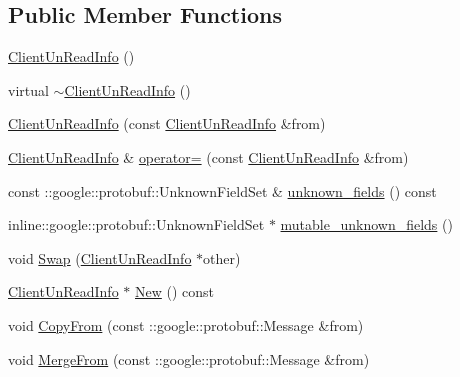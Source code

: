 \subsection*{Public Member Functions}
\begin{DoxyCompactItemize}
\item 
\hyperlink{class_i_m_1_1_base_define_1_1_client_un_read_info_afbe5918ae62b4854356a43552522e202}{Client\+Un\+Read\+Info} ()
\item 
virtual \hyperlink{class_i_m_1_1_base_define_1_1_client_un_read_info_a951a3fb6b364afc0ba8332c9e4d2c31f}{$\sim$\+Client\+Un\+Read\+Info} ()
\item 
\hyperlink{class_i_m_1_1_base_define_1_1_client_un_read_info_ab71864d1500981a38c5deb276567e373}{Client\+Un\+Read\+Info} (const \hyperlink{class_i_m_1_1_base_define_1_1_client_un_read_info}{Client\+Un\+Read\+Info} \&from)
\item 
\hyperlink{class_i_m_1_1_base_define_1_1_client_un_read_info}{Client\+Un\+Read\+Info} \& \hyperlink{class_i_m_1_1_base_define_1_1_client_un_read_info_a7e4bd8d8a0ce06bacd73c8afb77e8bb3}{operator=} (const \hyperlink{class_i_m_1_1_base_define_1_1_client_un_read_info}{Client\+Un\+Read\+Info} \&from)
\item 
const \+::google\+::protobuf\+::\+Unknown\+Field\+Set \& \hyperlink{class_i_m_1_1_base_define_1_1_client_un_read_info_a5cd7875e8d7758c912a6bbacaff1f7f4}{unknown\+\_\+fields} () const 
\item 
inline\+::google\+::protobuf\+::\+Unknown\+Field\+Set $\ast$ \hyperlink{class_i_m_1_1_base_define_1_1_client_un_read_info_a3b5cec8b2829705597638bf92f932b27}{mutable\+\_\+unknown\+\_\+fields} ()
\item 
void \hyperlink{class_i_m_1_1_base_define_1_1_client_un_read_info_a7ee953f5c93d976996d847c6ac786e98}{Swap} (\hyperlink{class_i_m_1_1_base_define_1_1_client_un_read_info}{Client\+Un\+Read\+Info} $\ast$other)
\item 
\hyperlink{class_i_m_1_1_base_define_1_1_client_un_read_info}{Client\+Un\+Read\+Info} $\ast$ \hyperlink{class_i_m_1_1_base_define_1_1_client_un_read_info_acac9657b9bccd18fdbf7805a8427f04b}{New} () const 
\item 
void \hyperlink{class_i_m_1_1_base_define_1_1_client_un_read_info_aa88069ff006e0e2549c2b091237c3e34}{Copy\+From} (const \+::google\+::protobuf\+::\+Message \&from)
\item 
void \hyperlink{class_i_m_1_1_base_define_1_1_client_un_read_info_a8ba992c38af3d1da907b6a4a02113c0b}{Merge\+From} (const \+::google\+::protobuf\+::\+Message \&from)

\end{DoxyCompactItemize}
